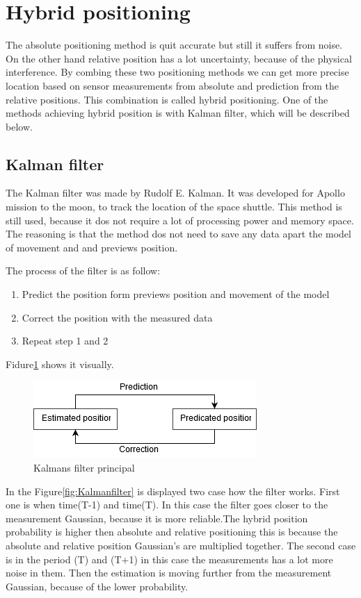 
\section{Hybrid positioning}

The absolute positioning method is quit accurate but still it suffers from noise. On the other hand relative position has a lot uncertainty, because of the physical interference. By combing these two positioning methods we can get more precise location based on sensor measurements from absolute and prediction from the relative positions. This combination is called hybrid positioning. One of the methods achieving hybrid position is with Kalman filter, which will be described below.

\subsection{Kalman filter}

The Kalman filter was made by Rudolf E. Kalman. It was developed for Apollo mission to the moon, to track the location of the space shuttle. This method is still used, because it dos not require a lot of processing power and memory space. The reasoning is that the method dos not need to save any data apart the model of movement and and previews position.

The process of the filter is as follow:
\begin{enumerate}
	\item Predict the position form previews position and movement of the model
	\item Correct the position with the measured data
	\item Repeat step 1 and 2
\end{enumerate}

Fidure\ref{fig:KalmanfilterRotation} shows it visually.

\begin{figure}[H]
	\centering
	\includegraphics[width=0.4\linewidth]{positioning/positioning/KalmanFilterProcess}
	\caption{Kalmans filter principal}
	\label{fig:KalmanfilterRotation}
\end{figure}

In the Figure\ref{fig:Kalmanfilter} is displayed two case how the filter works. First one is when time(T-1) and time(T). In this case the filter goes closer to the measurement Gaussian, because it is more reliable.The hybrid position probability is higher then absolute and relative positioning this is because the absolute and relative position Gaussian's are multiplied together. The second case is in the period (T) and (T+1) in this case the measurements has a lot more noise in them. Then the estimation is moving further from the measurement Gaussian, because of the lower probability. 

